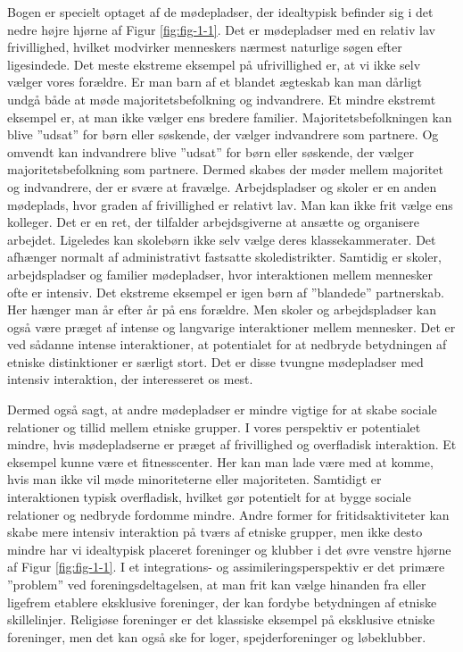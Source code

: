\documentclass[
]{book}
\begin{document}
Bogen er specielt optaget af de mødepladser, der idealtypisk befinder sig i det nedre højre hjørne af Figur \ref{fig:fig-1-1}. Det er mødepladser med en relativ lav frivillighed, hvilket modvirker menneskers nærmest naturlige søgen efter ligesindede. Det meste ekstreme eksempel på ufrivillighed er, at vi ikke selv vælger vores forældre. Er man barn af et blandet ægteskab kan man dårligt undgå både at møde majoritetsbefolkning og indvandrere. Et mindre ekstremt eksempel er, at man ikke vælger ens bredere familier. Majoritetsbefolkningen kan blive ''udsat'' for børn eller søskende, der vælger indvandrere som partnere. Og omvendt kan indvandrere blive ''udsat'' for børn eller søskende, der vælger majoritetsbefolkning som partnere. Dermed skabes der møder mellem majoritet og indvandrere, der er svære at fravælge. Arbejdspladser og skoler er en anden mødeplads, hvor graden af frivillighed er relativt lav. Man kan ikke frit vælge ens kolleger. Det er en ret, der tilfalder arbejdsgiverne at ansætte og organisere arbejdet. Ligeledes kan skolebørn ikke selv vælge deres klassekammerater. Det afhænger normalt af administrativt fastsatte skoledistrikter. Samtidig er skoler, arbejdspladser og familier mødepladser, hvor interaktionen mellem mennesker ofte er intensiv. Det ekstreme eksempel er igen børn af ''blandede'' partnerskab. Her hænger man år efter år på ens forældre. Men skoler og arbejdspladser kan også være præget af intense og langvarige interaktioner mellem mennesker. Det er ved sådanne intense interaktioner, at potentialet for at nedbryde betydningen af etniske distinktioner er særligt stort. Det er disse tvungne mødepladser med intensiv interaktion, der interesseret os mest.

Dermed også sagt, at andre mødepladser er mindre vigtige for at skabe sociale relationer og tillid mellem etniske grupper. I vores perspektiv er potentialet mindre, hvis mødepladserne er præget af frivillighed og overfladisk interaktion. Et eksempel kunne være et fitnesscenter. Her kan man lade være med at komme, hvis man ikke vil møde minoriteterne eller majoriteten. Samtidigt er interaktionen typisk overfladisk, hvilket gør potentielt for at bygge sociale relationer og nedbryde fordomme mindre. Andre former for fritidsaktiviteter kan skabe mere intensiv interaktion på tværs af etniske grupper, men ikke desto mindre har vi idealtypisk placeret foreninger og klubber i det øvre venstre hjørne af Figur \ref{fig:fig-1-1}. I et integrations- og assimileringsperspektiv er det primære ''problem'' ved foreningsdeltagelsen, at man frit kan vælge hinanden fra eller ligefrem etablere eksklusive foreninger, der kan fordybe betydningen af etniske skillelinjer. Religiøse foreninger er det klassiske eksempel på eksklusive etniske foreninger, men det kan også ske for loger, spejderforeninger og løbeklubber.
\end{document}
